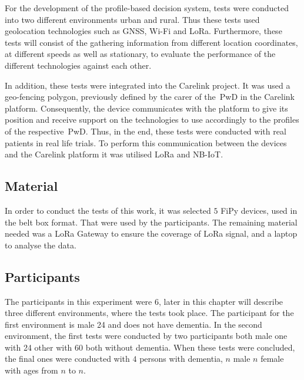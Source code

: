 For the development of the profile-based decision system, tests were conducted into two different environments urban and rural. Thus these tests used geolocation technologies such as GNSS, Wi-Fi and LoRa.
Furthermore, these tests will consist of the gathering information from different location coordinates, at different speeds as well as stationary, to evaluate the performance of the different technologies against each other. 

In addition, these tests were integrated into the Carelink project. It was used a geo-fencing polygon, previously defined by the carer of the~\gls{PwD} in the Carelink platform. Consequently, the device communicates with the platform to give its position and receive support on the technologies to use accordingly to the profiles of the respective~\gls{PwD}. Thus, in the end, these tests were conducted with real patients in real life trials. To perform this communication between the devices and the Carelink platform it was utilised LoRa and NB-IoT.



\subsection{Material}
\label{subsec:material}
In order to conduct the tests of this work, it was selected $5$ FiPy devices, used in the belt  box format. That were used by the participants. 
The remaining material needed was a LoRa Gateway to ensure the coverage of LoRa signal, and a laptop to analyse the data.


\subsection{Participants}
\label{subsec:Participants}
The participants in this experiment were $6$, later in this chapter will describe three different environments, where the tests took place. The participant for the first environment is male 24 and does not have dementia. In the second environment, the first tests were conducted by two participants both male one with 24 other with 60 both without dementia. When these tests were concluded, the final ones were conducted with $4$ persons with dementia, $n$ male $n$ female with ages from $n$ to $n$.

